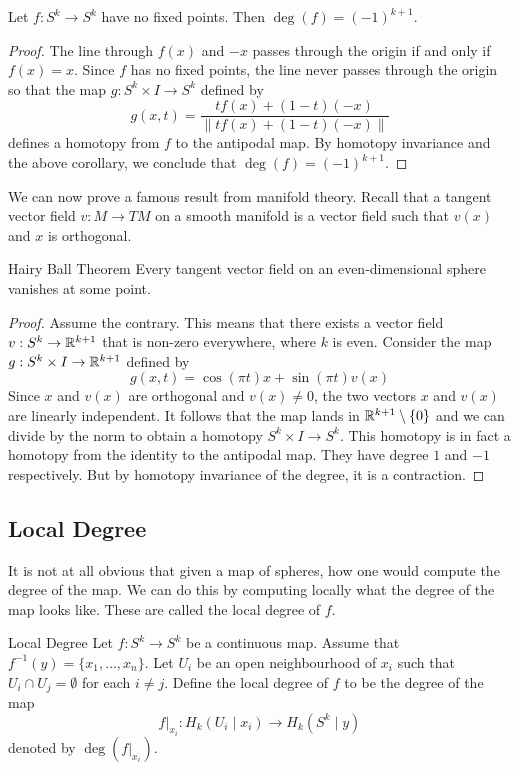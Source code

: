 \documentclass[a4paper]{article}
\begin{document}
\begin{crl}{}{} Let $f:S^k\to S^k$ have no fixed points. Then $\deg(f)=(-1)^{k+1}$. \tcbline
\begin{proof}
The line through $f(x)$ and $-x$ passes through the origin if and only if $f(x)=x$. Since $f$ has no fixed points, the line never passes through the origin so that the map $g:S^k\times I\to S^k$ defined by $$g(x,t)=\frac{tf(x)+(1-t)(-x)}{\|tf(x)+(1-t)(-x)\|}$$ defines a homotopy from $f$ to the antipodal map. By homotopy invariance and the above corollary, we conclude that $\deg(f)=(-1)^{k+1}$. 
\end{proof}
\end{crl}

We can now prove a famous result from manifold theory. Recall that a tangent vector field $v:M\to TM$ on a smooth manifold is a vector field such that $v(x)$ and $x$ is orthogonal. 

\begin{thm}{Hairy Ball Theorem}{} Every tangent vector field on an even-dimensional sphere vanishes at some point. \tcbline
\begin{proof}
Assume the contrary. This means that there exists a vector field $v:S^k\to\mathbb{R}^{k+1}$ that is non-zero everywhere, where $k$ is even. Consider the map $g:S^k\times I\to\mathbb{R}^{k+1}$ defined by $$g(x,t)=\cos(\pi t)x+\sin(\pi t)v(x)$$ Since $x$ and $v(x)$ are orthogonal and $v(x)\neq 0$, the two vectors $x$ and $v(x)$ are linearly independent. It follows that the map lands in $\mathbb{R}^{k+1}\setminus\{0\}$ and we can divide by the norm to obtain a homotopy $S^k\times I\to S^k$. This homotopy is in fact a homotopy from the identity to the antipodal map. They have degree $1$ and $-1$ respectively. But by homotopy invariance of the degree, it is a contraction. 
\end{proof}
\end{thm}

\subsection{Local Degree}
It is not at all obvious that given a map of spheres, how one would compute the degree of the map. We can do this by computing locally what the degree of the map looks like. These are called the local degree of $f$. 

\begin{defn}{Local Degree}{} Let $f:S^k\to S^k$ be a continuous map. Assume that $f^{-1}(y)=\{x_1,\dots,x_n\}$. Let $U_i$ be an open neighbourhood of $x_i$ such that $U_i\cap U_j=\emptyset$ for each $i\neq j$. Define the local degree of $f$ to be the degree of the map $$f|_{x_i}:H_k(U_i\;|\;x_i)\to H_k(S^k\;|\;y)$$ denoted by $\deg(f|_{x_i})$. 
\end{defn}
\end{document}
